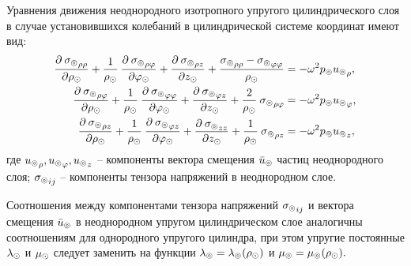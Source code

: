 Уравнения движения неоднородного изотропного упругого цилиндрического слоя в случае установившихся колебаний в цилиндрической системе координат имеют вид:
\begin{equation}\label{equation_dvij_splosh_sred}
\begin{aligned}
\frac{\partial\:{\sigma_\circledcirc}_{\rho\rho}}{
\partial \rho_\odot}+\frac{1}{\rho_\odot}\:\frac{\partial\:{\sigma_\circledcirc}_{\rho\varphi}}{\partial\varphi_\odot}+\frac{\partial\:{\sigma_\circledcirc}_{\rho z}}{\partial z_\odot}+\frac{{\sigma_\circledcirc}_{\rho\rho}-{\sigma_\circledcirc}_{\varphi\varphi}}{\rho_\odot}&=-\omega^2 p_\circledcirc{u_\circledcirc}_{\rho},\\
\frac{\partial\:{\sigma_\circledcirc}_{\rho\varphi}}{
\partial \rho_\odot}+\frac{1}{\rho_\odot}\:\frac{\partial\:{\sigma_\circledcirc}_{\varphi\varphi}}{\partial\varphi_\odot}+\frac{\partial\:{\sigma_\circledcirc}_{\varphi z}}{\partial z_\odot}+\frac{2}{\rho_\odot}\:{\sigma_\circledcirc}_{\rho\varphi}&=-\omega^2 p_\circledcirc{u_\circledcirc}_{\varphi},\\
\frac{\partial\:{\sigma_\circledcirc}_{\rho z}}{
\partial \rho_\odot}+\frac{1}{\rho_\odot}\:\frac{\partial\:{\sigma_\circledcirc}_{\varphi z}}{\partial\varphi_\odot}+\frac{\partial\:{\sigma_\circledcirc}_{zz}}{\partial z_\odot}+\frac{1}{\rho_\odot}\:{\sigma_\circledcirc}_{\rho z}&=-\omega^2 p_\circledcirc{u_\circledcirc}_{z},
\end{aligned}
\end{equation}
где ${u_\circledcirc}_{\rho}, {u_\circledcirc}_{\varphi}, {u_\circledcirc}_{z}$ -- компоненты вектора смещения $\bar{u}_\circledcirc$ частиц неоднородного слоя; 
\newline
${\sigma_\circledcirc}_{ij}$ -- компоненты тензора напряжений в неоднородном слое.

Соотношения между компонентами тензора напряжений ${\sigma_\circledcirc}_{ij}$ и вектора смещения $\bar{u}_\circledcirc$ в неоднородном упругом цилиндрическом слое аналогичны соотношениям для однородного упругого цилиндра, при этом упругие постоянные $\lambda_\odot$ и $\mu_\odot$ следует заменить на функции $\lambda_\circledcirc=\lambda_\circledcirc(\rho_\odot)$ и $\mu_\circledcirc=\mu_\circledcirc(\rho_\odot).$

